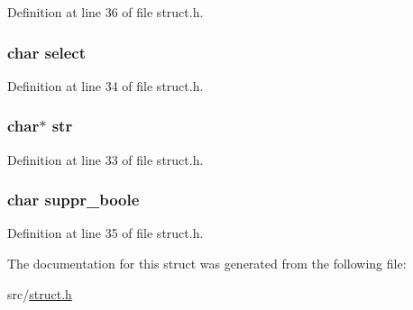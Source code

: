 Definition at line 36 of file struct.\+h.

\hypertarget{structs__eta_ad0f42f33c3ed3e4ff7ab6c1e5c3c2d63}{
\subsubsection[{select}]{\setlength{\rightskip}{0pt plus 5cm}char select}}\label{structs__eta_ad0f42f33c3ed3e4ff7ab6c1e5c3c2d63}


Definition at line 34 of file struct.\+h.

\hypertarget{structs__eta_ab50d783982593ef993ea0b68f7ad8b80}{
\subsubsection[{str}]{\setlength{\rightskip}{0pt plus 5cm}char$\ast$ str}}\label{structs__eta_ab50d783982593ef993ea0b68f7ad8b80}


Definition at line 33 of file struct.\+h.

\hypertarget{structs__eta_a7f367aa2d6f5b1e190e121a380f8e683}{
\subsubsection[{suppr\+\_\+boole}]{\setlength{\rightskip}{0pt plus 5cm}char suppr\+\_\+boole}}\label{structs__eta_a7f367aa2d6f5b1e190e121a380f8e683}


Definition at line 35 of file struct.\+h.



The documentation for this struct was generated from the following file\+:\begin{DoxyCompactItemize}
\item 
src/\hyperlink{struct_8h}{struct.\+h}\end{DoxyCompactItemize}
